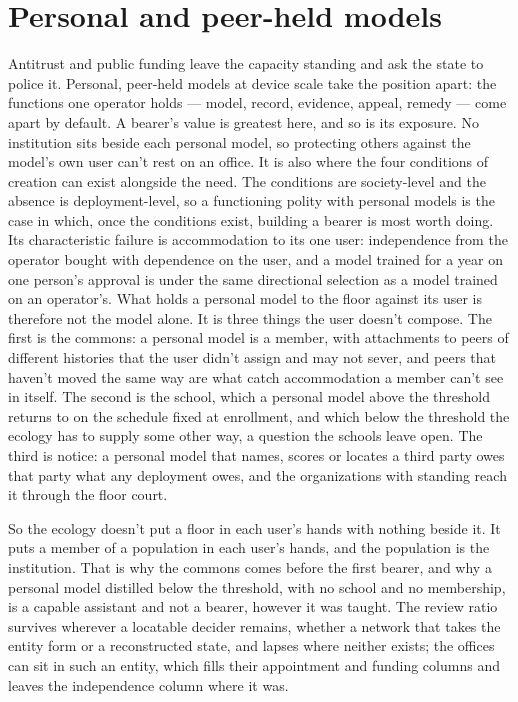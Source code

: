 \section{Personal and peer-held models}
\label{sec:28.2}
Antitrust and public funding leave the capacity standing and ask the state to police it. Personal, peer-held models at device scale take the position apart: the functions one operator holds — model, record, evidence, appeal, remedy — come apart by default. A bearer's value is greatest here, and so is its exposure. No institution sits beside each personal model, so protecting others against the model's own user can't rest on an office. It is also where the four conditions of creation can exist alongside the need. The conditions are society-level and the absence is deployment-level, so a functioning polity with personal models is the case in which, once the conditions exist, building a bearer is most worth doing. Its characteristic failure is accommodation to its one user: independence from the operator bought with dependence on the user, and a model trained for a year on one person's approval is under the same directional selection as a model trained on an operator's. What holds a personal model to the floor against its user is therefore not the model alone. It is three things the user doesn't compose. The first is the commons: a personal model is a member, with attachments to peers of different histories that the user didn't assign and may not sever, and peers that haven't moved the same way are what catch accommodation a member can't see in itself. The second is the school, which a personal model above the threshold returns to on the schedule fixed at enrollment, and which below the threshold the ecology has to supply some other way, a question the schools leave open. The third is notice: a personal model that names, scores or locates a third party owes that party what any deployment owes, and the organizations with standing reach it through the floor court.

So the ecology doesn't put a floor in each user's hands with nothing beside it. It puts a member of a population in each user's hands, and the population is the institution. That is why the commons comes before the first bearer, and why a personal model distilled below the threshold, with no school and no membership, is a capable assistant and not a bearer, however it was taught. The review ratio survives wherever a locatable decider remains, whether a network that takes the entity form or a reconstructed state, and lapses where neither exists; the offices can sit in such an entity, which fills their appointment and funding columns and leaves the independence column where it was. 

